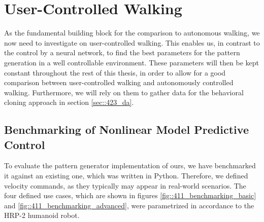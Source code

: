 \FloatBarrier
\section{User-Controlled Walking}
\label{sec::41_uc}
As the fundamental building block for the comparison to autonomous walking, we now need to investigate on user-controlled walking. This enables us, in contrast to the control by a neural network, to find the best parameters for the pattern generation in a well controllable environment. These parameters will then be kept constant throughout the rest of this thesis, in order to allow for a good comparison between user-controlled walking and autonomously controlled walking. Furthermore, we will rely on them to gather data for the behavioral cloning approach in section \ref{sec::423_da}.
\FloatBarrier
\subsection{Benchmarking of Nonlinear Model Predictive Control}
\label{sec::411_bm}
To evaluate the pattern generator implementation of ours, we have benchmarked it against an existing one, which was written in Python. Therefore, we defined velocity commands, as they typically may appear in real-world scenarios. The four defined use cases, which are shown in figures \ref{fig::411_benchmarking_basic} and \ref{fig::411_benchmarking_advanced}, were parametrized in accordance to the HRP-2 humanoid robot.
